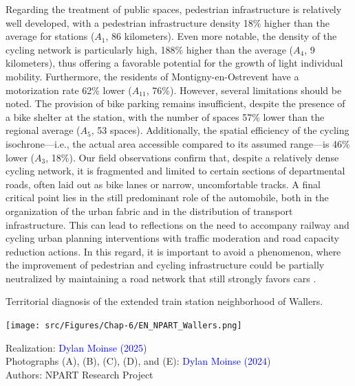 \begin{refsegment}
Regarding the treatment of public spaces, pedestrian infrastructure is relatively well developed, with a pedestrian infrastructure density 18\% higher than the average for stations (\(A_{1}\), 86 kilometers). Even more notable, the density of the cycling network is particularly high, 188\% higher than the average (\(A_{4}\), 9 kilometers), thus offering a favorable potential for the growth of light individual mobility. Furthermore, the residents of Montigny-en-Ostrevent have a motorization rate 62\% lower (\(A_{11}\), 76\%). However, several limitations should be noted. The provision of bike parking remains insufficient, despite the presence of a bike shelter at the station, with the number of spaces 57\% lower than the regional average (\(A_{5}\), 53 spaces). Additionally, the spatial efficiency of the cycling isochrone—i.e., the actual area accessible compared to its assumed range—is 46\% lower (\(A_{3}\), 18\%). Our field observations confirm that, despite a relatively dense cycling network, it is fragmented and limited to certain sections of departmental roads, often laid out as bike lanes or narrow, uncomfortable tracks. A final critical point lies in the still predominant role of the automobile, both in the organization of the urban fabric and in the distribution of transport infrastructure. This can lead to reflections on the need to accompany railway and cycling urban planning interventions with traffic moderation and road capacity reduction actions. In this regard, it is important to avoid a  phenomenon, where the improvement of pedestrian and cycling infrastructure could be partially neutralized by maintaining a road network that still strongly favors cars \textcolor{blue}{\autocite[259]{lo_feudo_scenario_2014}}.%

    \begin{carte}[h!]\vspace*{4pt}
        \caption{Territorial diagnosis of the extended train station neighborhood of Wallers.}
        \label{fig-chap6:monographie-wallers}
        \centerline{\texttt{[image: src/Figures/Chap-6/EN\_NPART\_Wallers.png]}}
        \vspace{5pt}
        \begin{flushright}\scriptsize{
        Realization: \textcolor{blue}{Dylan Moinse (2025)}
        \\
        Photographs (A), (B), (C), (D), and (E): \textcolor{blue}{Dylan Moinse (2024)}
        \\
        Authors: \acrshort{NPART} Research Project
        }\end{flushright}
    \end{carte}


\end{refsegment}
